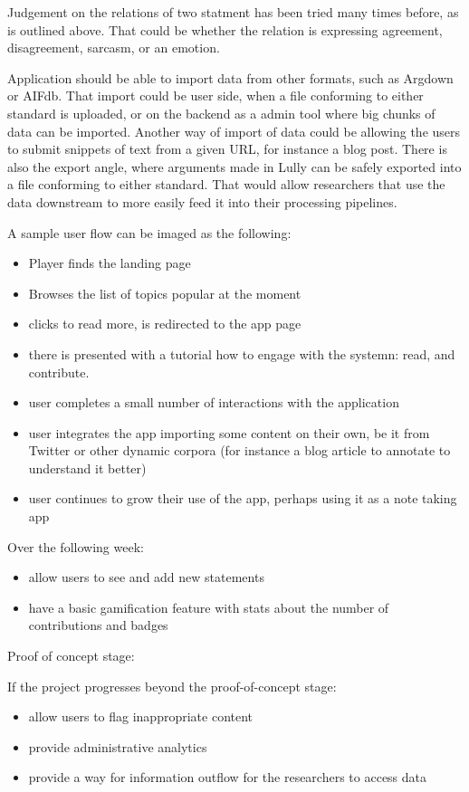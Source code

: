 \documentclass{report}
\begin{document}
{Judgement on the relations of two statment has been tried many times before, as is outlined above. That could be whether the relation is expressing agreement, disagreement, sarcasm, or an emotion.

Application should be able to import data from other formats, such as Argdown or AIFdb. That import could be user side, when a file conforming to either standard is uploaded, or on the backend as a admin tool where big chunks of data can be imported.
Another way of import of data could be allowing the users to submit snippets of text from a given URL, for instance a blog post.
There is also the export angle, where arguments made in Lully can be safely exported into a file conforming to either standard. That would allow researchers that use the data downstream to more easily feed it into their processing pipelines.


A sample user flow can be imaged as the following:
\begin{itemize}
  \item Player finds the landing page
  \item Browses the list of topics popular at the moment
  \item clicks to read more, is redirected to the app page
  \item there is presented with a tutorial how to engage with the systemn: read, and contribute.
\end{itemize}

\begin{itemize}
  \item user completes a small number of interactions with the application
  \item user integrates the app importing some content on their own, be it from Twitter or other dynamic corpora (for instance a blog article to annotate to understand it better)
  \item user continues to grow their use of the app, perhaps using it as a note taking app
\end{itemize}

Over the following week:
\begin{itemize}
  \item allow users to see and add new statements
  \item have a basic gamification feature with stats about the number of contributions and badges
\end{itemize}
Proof of concept stage:

If the project progresses beyond the proof-of-concept stage:
\begin{itemize}
\item allow users to flag inappropriate content
\item provide administrative analytics 
\item provide a way for information outflow for the researchers to access data
\end{itemize}

}
\end{document}
